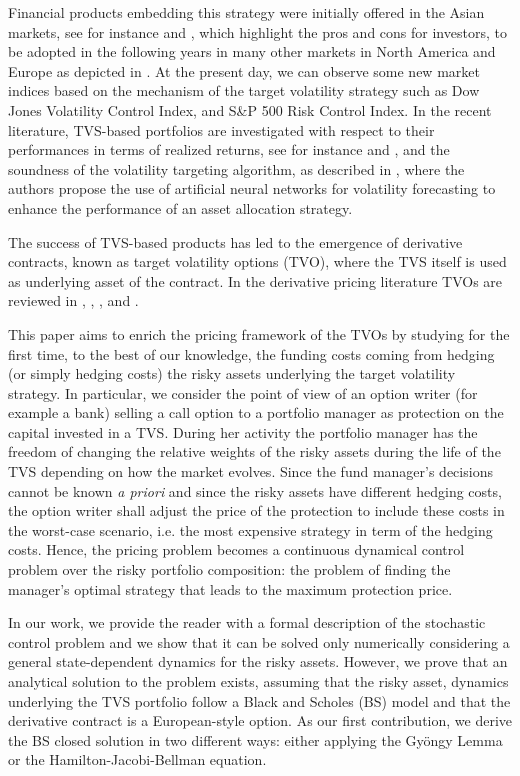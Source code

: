 \documentclass[runningheads]{m2ef}
\begin{document}
	Financial products embedding this strategy were initially offered in the Asian markets, see for instance \cite{Chew2011} and \cite{Xue2012}, which highlight the pros and cons for investors, to be adopted in the following years in many other markets in North America and Europe as depicted in \cite{Morrison2013}. At the present day, we can observe some new market indices based on the mechanism of the target volatility strategy such as Dow Jones Volatility Control Index, and S\&P 500 Risk Control Index.
	In the recent literature, TVS-based portfolios are investigated with respect to their performances in terms of realized returns, see for instance \cite{Hocquard2013} and \cite{Perchet2016}, and the soundness of the volatility targeting algorithm, as described in \cite{Kim2018}, where the authors propose the use of artificial neural networks for volatility forecasting to enhance the performance of an asset allocation strategy. 

	The success of TVS-based products has led to the emergence of derivative contracts, known as target volatility options (TVO), where the TVS itself is used as underlying asset of the contract. In the derivative pricing literature TVOs are reviewed in \cite{Albeverio2019}, \cite{DiGraziano2012}, \cite{DiPersio2019}, and \cite{Grasselli2016}. 

	This paper aims to enrich the pricing framework of the TVOs by studying for the first time, to the best of our knowledge, the funding costs coming from hedging (or simply hedging costs) the risky assets underlying the target volatility strategy. In particular, we consider the point of view of an option writer (for example a bank) selling a call option to a portfolio manager as protection on the capital invested in a TVS. During her activity the portfolio manager has the freedom of changing the relative weights of the risky assets during the life of the TVS depending on how the market evolves. Since the fund manager's decisions cannot be known {\it a priori} and since the risky assets have different hedging costs, the option writer shall adjust the price of the protection to include these costs in the worst-case scenario, i.e. the most expensive strategy in term of the hedging costs. Hence, the pricing problem becomes a continuous dynamical control problem over the risky portfolio composition: the problem of finding the manager's optimal strategy that leads to the maximum protection price. 

	In our work, we provide the reader with a formal description of the stochastic control problem and we show that it can be solved only numerically considering a general state-dependent dynamics for the risky assets. However, we prove that an analytical solution to the problem exists, assuming that the risky asset, dynamics underlying the TVS portfolio follow a Black and Scholes (BS) model \cite{BlackScholes1973} and that the derivative contract is a European-style option. As our first contribution, we derive the BS closed solution in two different ways: either applying the Gy\"ongy Lemma or the Hamilton-Jacobi-Bellman equation. 
\end{document}
